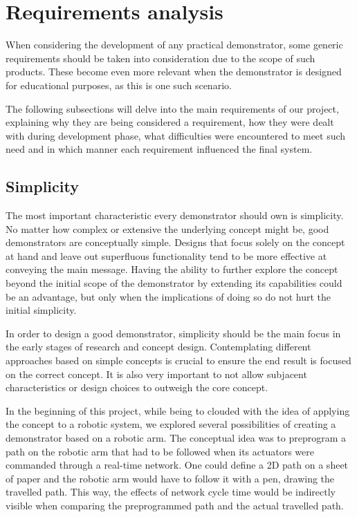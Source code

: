 \section{Requirements analysis} \label{sec:requirements}


When considering the development of any practical demonstrator, some generic requirements should be taken into consideration due to the scope of such products.
These become even more relevant when the demonstrator is designed for educational purposes, as this is one such scenario.

The following subsections will delve into the main requirements of our project, explaining why they are being considered a requirement, how they were dealt with during development phase, what difficulties were encountered to meet such need and in which manner each requirement influenced the final system.

\subsection{Simplicity}
The most important characteristic every demonstrator should own is simplicity.
No matter how complex or extensive the underlying concept might be, good demonstrators are conceptually simple.
Designs that focus solely on the concept at hand and leave out superfluous functionality tend to be more effective at conveying the main message.
Having the ability to further explore the concept beyond the initial scope of the demonstrator by extending its capabilities could be an advantage, but only when the implications of doing so do not hurt the initial simplicity.

In order to design a good demonstrator, simplicity should be the main focus in the early stages of research and concept design.
Contemplating different approaches based on simple concepts is crucial to ensure the end result is focused on the correct concept.
It is also very important to not allow subjacent characteristics or design choices to outweigh the core concept.

In the beginning of this project, while being to clouded with the idea of applying the concept to a robotic system, we explored several possibilities of creating a demonstrator based on a robotic arm.
The conceptual idea was to preprogram a path on the robotic arm that had to be followed when its actuators were commanded through a real-time network.
One could define a 2D path on a sheet of paper and the robotic arm would have to follow it with a pen, drawing the travelled path.
This way, the effects of network cycle time would be indirectly visible when comparing the preprogrammed path and the actual travelled path.

